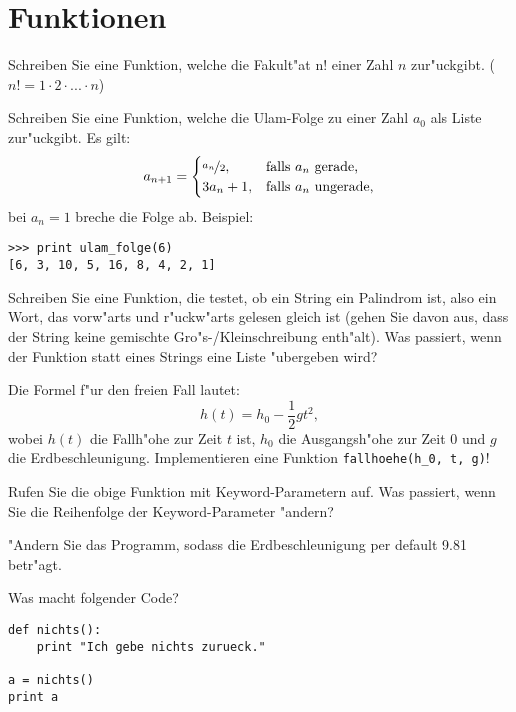 \section*{Funktionen}
\begin{aufgabe}[Fakult"at]
\label{fakultaet}
Schreiben Sie eine Funktion, welche die Fakult"at n! einer Zahl $n$ zur"uckgibt. ($n! = 1 \cdot 2 \cdot ... \cdot n$)
\end{aufgabe}

\begin{aufgabe}
\label{ulamfolge}
Schreiben Sie eine Funktion, welche die Ulam-Folge zu einer Zahl $a_0$ als Liste zur"uckgibt. Es gilt: 
\begin{displaymath}
a_{n+1} =
\begin{cases}
\nicefrac{a_n}{2}, & \text{falls } a_n \text{ gerade,}\\
3 a_n+1, & \text{falls } a_n \text{ ungerade,}\\
\end{cases}
\end{displaymath}
 bei $a_n=1$ breche die Folge ab. 
Beispiel: 
\begin{lstlisting}
>>> print ulam_folge(6)
[6, 3, 10, 5, 16, 8, 4, 2, 1]
\end{lstlisting}
\end{aufgabe}

\begin{aufgabe}[Palindrom]
\label{palindrom}
Schreiben Sie eine Funktion, die testet, ob ein String ein Palindrom ist, also ein Wort, das vorw"arts und r"uckw"arts gelesen gleich ist (gehen Sie davon aus, dass der String keine gemischte Gro"s-/Kleinschreibung enth"alt). Was passiert, wenn der Funktion statt eines Strings eine Liste "ubergeben wird? 
\end{aufgabe}

\begin{aufgabe}
\label{freier_fall}
Die Formel f"ur den freien Fall lautet: 
\begin{displaymath}
h(t) = h_0 - \frac{1}{2} gt^2, 
\end{displaymath}
wobei $h(t)$ die Fallh"ohe zur Zeit $t$ ist, $h_0$ die Ausgangsh"ohe zur Zeit 0 und $g$ die Erdbeschleunigung. Implementieren eine Funktion \lstinline{fallhoehe(h_0, t, g)}!
\begin{teilaufgabe}
Rufen Sie die obige Funktion mit Keyword-Parametern auf. Was passiert, wenn Sie die Reihenfolge der Keyword-Parameter "andern?
\end{teilaufgabe}
\begin{teilaufgabe}
"Andern Sie das Programm, sodass die Erdbeschleunigung per default 9.81 betr"agt.
\end{teilaufgabe}
\end{aufgabe}

\begin{aufgabe}
Was macht folgender Code?\\
\begin{lstlisting}
def nichts():
    print "Ich gebe nichts zurueck."

a = nichts()
print a
\end{lstlisting}
\end{aufgabe}


